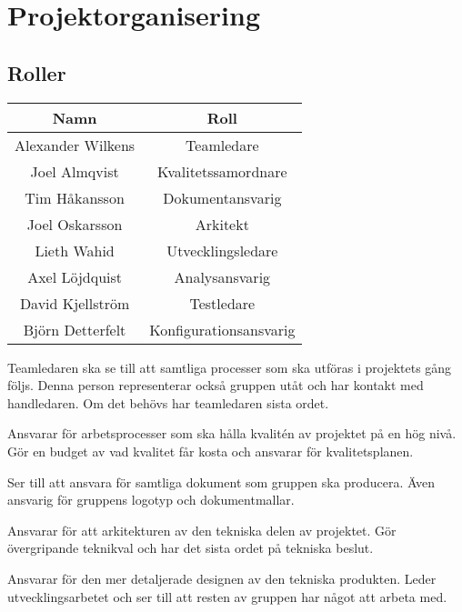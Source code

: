 \section{Projektorganisering}

\subsection{Roller}
\begin{center}
    \begin{tabular}{| c | c |}
        \hline
        \textbf{Namn} & \textbf{Roll} \\
        \hline
        \centering Alexander Wilkens & Teamledare\\
        \hline
        \centering Joel Almqvist & Kvalitetssamordnare\\
        \hline
        \centering Tim Håkansson & Dokumentansvarig\\
        \hline
        \centering Joel Oskarsson & Arkitekt\\
        \hline
        \centering Lieth Wahid & Utvecklingsledare\\
        \hline
        \centering Axel Löjdquist & Analysansvarig\\
        \hline
        \centering David Kjellström & Testledare\\
        \hline
        \centering Björn Detterfelt & Konfigurationsansvarig\\
        \hline
    \end{tabular}
\end{center}
Teamledaren ska se till att samtliga processer som ska utföras i projektets gång följs. Denna person representerar också gruppen utåt och har kontakt med handledaren. Om det behövs har teamledaren sista ordet.

Ansvarar för arbetsprocesser som ska hålla kvalitén av projektet på en hög nivå. Gör en budget av vad kvalitet får kosta och ansvarar för kvalitetsplanen.

Ser till att ansvara för samtliga dokument som gruppen ska producera. Även ansvarig för gruppens logotyp och dokumentmallar.

Ansvarar för att arkitekturen av den tekniska delen av projektet. Gör övergripande teknikval och har det sista ordet på tekniska beslut.

Ansvarar för den mer detaljerade designen av den tekniska produkten. Leder utvecklingsarbetet och ser till att resten av gruppen har något att arbeta med.

